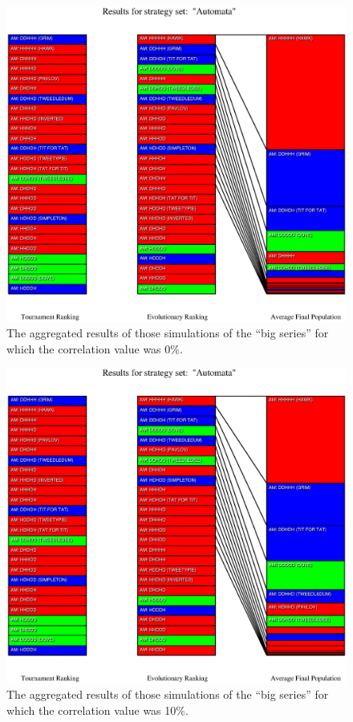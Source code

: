 \begin{figure}
\begin{center}
\includegraphics[width=20cm]{tables/Automata_C0.000.eps}
\caption{\label{Automata_C0000} The aggregated results of those
simulations of the ``big series'' for which the correlation value was 0\%.}
\end{center}
\end{figure}

\begin{figure}
\begin{center}
\includegraphics[width=20cm]{tables/Automata_C0.100.eps}
\caption{\label{Automata_C0100} The aggregated results of those
simulations of the ``big series'' for which the correlation value was 10\%.}
\end{center}
\end{figure}

